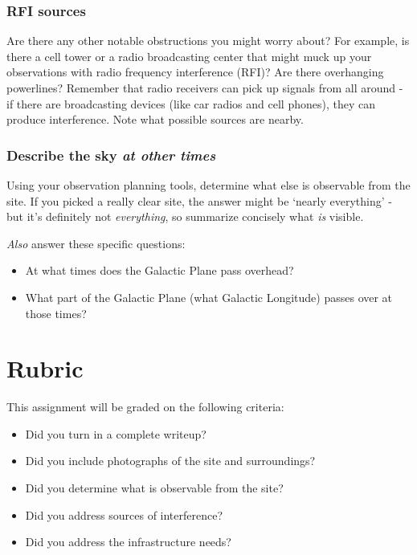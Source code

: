 \documentclass[11pt]{article}
\begin{document}
\subsubsection{RFI sources}
Are there any other notable obstructions you might worry about?  For example, is there a cell tower
or a radio broadcasting center that might muck up your observations with radio frequency interference (RFI)?
Are there overhanging powerlines?  Remember that radio receivers can pick up signals from all around - 
if there are broadcasting devices (like car radios and cell phones), they can produce interference.
Note what possible sources are nearby.


\subsubsection{Describe the sky \emph{at other times}}
Using your observation planning tools, determine what else is observable from the site.
If you picked a really clear site, the answer might be `nearly everything' - but it's definitely not \emph{everything},
so summarize concisely what \emph{is} visible.

\emph{Also} answer these specific questions:
\begin{itemize}
    \item At what times does the Galactic Plane pass overhead?  
    \item What part of the Galactic Plane (what Galactic Longitude) passes over
        at those times?
\end{itemize}


\section{Rubric}
This assignment will be graded on the following criteria:
\begin{itemize}
    \item Did you turn in a complete writeup?
    \item Did you include photographs of the site and surroundings?
    \item Did you determine what is observable from the site?
    \item Did you address sources of interference?
    \item Did you address the infrastructure needs?
\end{itemize}
\end{document}
